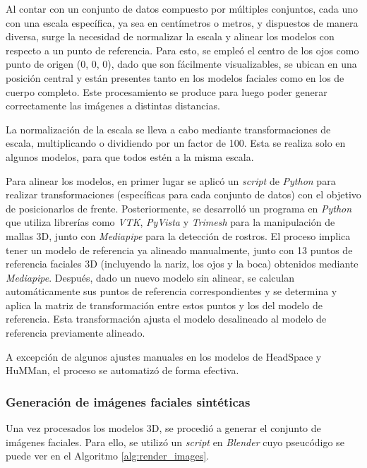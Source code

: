 Al contar con un conjunto de datos compuesto por múltiples conjuntos, cada uno con una escala específica, ya sea en centímetros o metros, y dispuestos de manera diversa, surge la necesidad de normalizar la escala y alinear los modelos con respecto a un punto de referencia. Para esto, se empleó el centro de los ojos como punto de origen (0, 0, 0), dado que son fácilmente visualizables, se ubican en una posición central y están presentes tanto en los modelos faciales como en los de cuerpo completo. Este procesamiento se produce para luego poder generar correctamente las imágenes a distintas distancias.

La normalización de la escala se lleva a cabo mediante transformaciones de escala, multiplicando o dividiendo por un factor de 100. Esta se realiza solo en algunos modelos, para que todos estén a la misma escala.

Para alinear los modelos, en primer lugar se aplicó un \textit{script} de \textit{Python} para realizar transformaciones (específicas para cada conjunto de datos) con el objetivo de posicionarlos de frente. Posteriormente, se desarrolló un programa en \textit{Python} que utiliza librerías como \textit{VTK}, \textit{PyVista} y \textit{Trimesh} para la manipulación de mallas 3D, junto con \textit{Mediapipe} para la detección de rostros. El proceso implica tener un modelo de referencia ya alineado manualmente, junto con 13 puntos de referencia faciales 3D (incluyendo la nariz, los ojos y la boca) obtenidos mediante \textit{Mediapipe}. Después, dado un nuevo modelo sin alinear, se calculan automáticamente sus puntos de referencia correspondientes y se determina y aplica la matriz de transformación entre estos puntos y los del modelo de referencia. Esta transformación ajusta el modelo desalineado al modelo de referencia previamente alineado.

A excepción de algunos ajustes manuales en los modelos de HeadSpace y HuMMan, el proceso se automatizó de forma efectiva.

\subsubsection{Generación de imágenes faciales sintéticas}

Una vez procesados los modelos 3D, se procedió a generar el conjunto de imágenes faciales. Para ello, se utilizó un \textit{script} en \textit{Blender} cuyo pseucódigo se puede ver en el Algoritmo \ref{alg:render_images}. 

